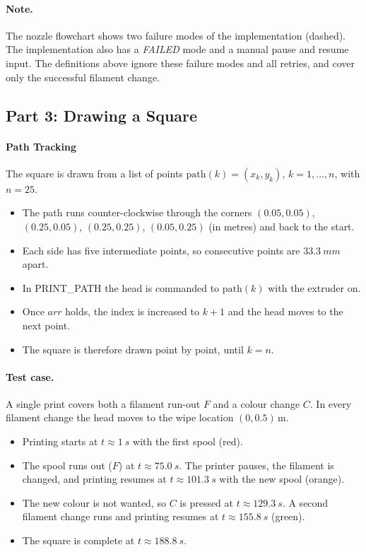 \paragraph{Note.} The nozzle flowchart shows two failure modes of the implementation (dashed). The implementation also has a \textit{FAILED} mode and a manual pause and resume input. The definitions above ignore these failure modes and all retries, and cover only the successful filament change.

\subsection{Part 3: Drawing a Square}
\label{sec:q3_part3}

\paragraph{Path Tracking}The square is drawn from a list of points $\mathrm{path}(k) = (x_k, y_k)$, $k = 1, \dots, n$, with $n = 25$.
\begin{itemize}[nosep]
    \item The path runs counter-clockwise through the corners $(0.05, 0.05)$, $(0.25, 0.05)$, $(0.25, 0.25)$, $(0.05, 0.25)$ (in metres) and back to the start.
    \item Each side has five intermediate points, so consecutive points are $\SI{33.3}{mm}$ apart.
    \item In PRINT\_PATH the head is commanded to $\mathrm{path}(k)$ with the extruder on.
    \item Once $\mathit{arr}$ holds, the index is increased to $k + 1$ and the head moves to the next point.
    \item The square is therefore drawn point by point, until $k = n$.
\end{itemize}


\paragraph{Test case.} A single print covers both a filament run-out $F$ and a colour change $C$. In every filament change the head moves to the wipe location $(0, 0.5)$\,m.
\begin{itemize}[nosep]
    \item Printing starts at $t\approx\SI{1}{s}$ with the first spool (red).
    \item The spool runs out ($F$) at $t\approx\SI{75.0}{s}$. The printer pauses, the filament is changed, and printing resumes at $t\approx\SI{101.3}{s}$ with the new spool (orange).
    \item The new colour is not wanted, so $C$ is pressed at $t\approx\SI{129.3}{s}$. A second filament change runs and printing resumes at $t\approx\SI{155.8}{s}$ (green).
    \item The square is complete at $t\approx\SI{188.8}{s}$.
\end{itemize}

